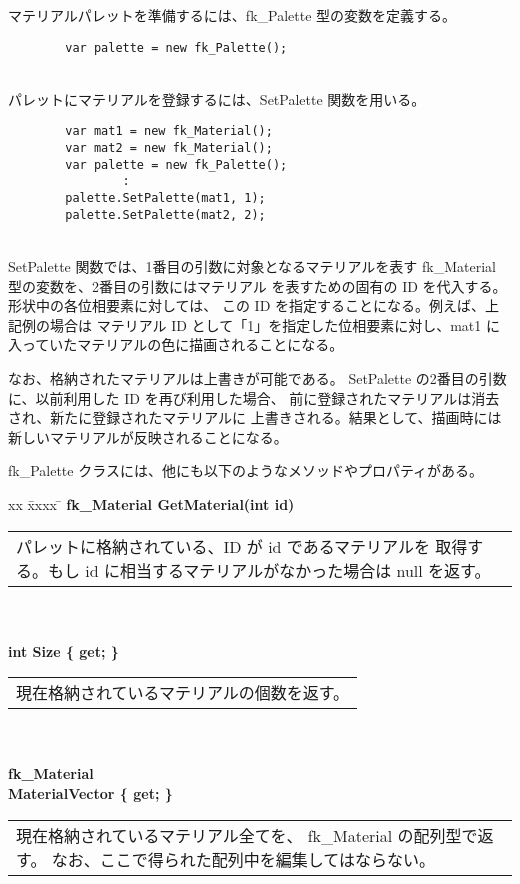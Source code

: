 マテリアルパレットを準備するには、fk\_Palette 型の変数を定義する。
\\
\begin{screen}
\begin{verbatim}
        var palette = new fk_Palette();
\end{verbatim}
\end{screen}
~ \\
パレットにマテリアルを登録するには、SetPalette 関数を用いる。
\\
\begin{screen}
\begin{verbatim}
        var mat1 = new fk_Material();
        var mat2 = new fk_Material();
        var palette = new fk_Palette();
                :
        palette.SetPalette(mat1, 1);
        palette.SetPalette(mat2, 2);
\end{verbatim}
\end{screen}
~ \\
SetPalette 関数では、1番目の引数に対象となるマテリアルを表す
fk\_Material 型の変数を、2番目の引数にはマテリアル
を表すための固有の ID を代入する。形状中の各位相要素に対しては、
この ID を指定することになる。例えば、上記例の場合は
マテリアル ID として「1」を指定した位相要素に対し、mat1 に
入っていたマテリアルの色に描画されることになる。

なお、格納されたマテリアルは上書きが可能である。
SetPalette の2番目の引数に、以前利用した ID を再び利用した場合、
前に登録されたマテリアルは消去され、新たに登録されたマテリアルに
上書きされる。結果として、描画時には新しいマテリアルが反映されることになる。

fk\_Palette クラスには、他にも以下のようなメソッドやプロパティがある。
\begin{tabbing}
xx \= xxxx \= \kill
\> \textbf{fk\_Material GetMaterial(int id)} \\
	\> \> \begin{tabular}{p{15cm}}
		パレットに格納されている、ID が id であるマテリアルを
		取得する。もし id に相当するマテリアルがなかった場合は
		null を返す。
	\end{tabular} \\ \\

\> \textbf{int Size \{ get; \} } \\
	\> \> \begin{tabular}{p{15cm}}
		現在格納されているマテリアルの個数を返す。
	\end{tabular} \\ \\

\> \textbf{fk\_Material \[\] MaterialVector \{ get; \} } \\
	\> \> \begin{tabular}{p{15cm}}
		現在格納されているマテリアル全てを、
		fk\_Material の配列型で返す。
		なお、ここで得られた配列中を編集してはならない。
	\end{tabular} \\ \\
\end{tabbing}

